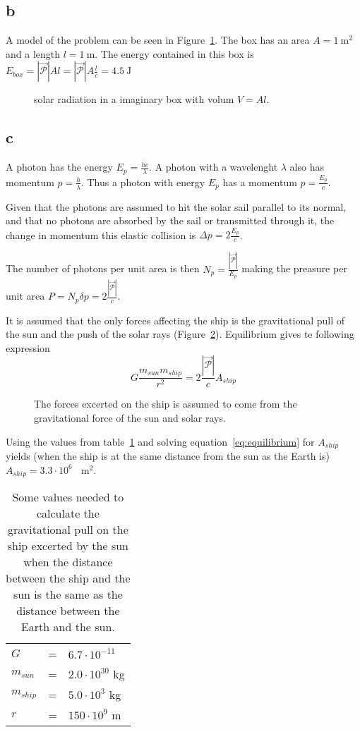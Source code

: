 \documentclass[12pt,a4paper]{article}
\begin{document}
\subsection{b}
A model of the problem can be seen in Figure~\ref{fig:box}. The box has an area $A=\SI{1}{\metre^2}$ and a length $l=\SI{1}{\metre}$.
The energy contained in this box is $E_{box}=|\vec{\mathcal{P}}|Al=|\vec{\mathcal{P}}|A\frac{l}{c}=\SI{4.5}{\joule}$
\begin{figure}\centering
  \scalebox{1}{}
  \caption{\label{fig:box} solar radiation in a imaginary box with volum $V=Al$.}
\end{figure}

\subsection{c}
A photon has the energy $E_p=\frac{hc}{\lambda}$. A photon with a wavelenght $\lambda$ also has momentum $p=\frac{h}{\lambda}$. Thus a photon with energy $E_p$ has a momentum $p=\frac{E_p}{c}$.

Given that the photons are assumed to hit the solar sail parallel to its normal, and that no photons are absorbed by the sail or transmitted through it, the change in momentum this elastic collision is $\Delta p=2\frac{E_p}{c}$.

The number of photons per unit area is then $N_p=\frac{|\vec{\mathcal{P}}|}{E_p}$ making the preasure per unit area $P=N_p\delta p=2\frac{|\vec{\mathcal{P}}|}{c}$.

It is assumed that the only forces affecting the ship is the gravitational pull of the sun and the push of the solar rays (Figure~\ref{fig:ship}). Equilibrium gives te following expression
\begin{equation}
  G\frac{m_{sun}m_{ship}}{r^2}=2\frac{|\vec{\mathcal{P}}|}{c}A_{ship}
  \label{eq:equilibrium}
\end{equation}
\begin{figure}\centering
  \scalebox{1}{}
  \caption{\label{fig:ship} The forces excerted on the ship is assumed to come from the gravitational force of the sun and solar rays.}
\end{figure}
Using the values from table~\ref{tab:constants} and solving equation~\ref{eq:equilibrium} for $A_{ship}$ yields (when the ship is at the same distance from the sun as the Earth is) $A_{ship}=3.3\cdot 10^{6}\text{ }\SI{}{\metre^2}$.
\begin{table}
  \centering
  \caption{\label{tab:constants} Some values needed to calculate the gravitational pull on the ship excerted by the sun when the distance between the ship and the sun is the same as the distance between the Earth and the sun.}
  \begin{tabular}{|lll|} \hline
    $G$ & = & $6.7\cdot 10^{-11}$ \\
    $m_{sun}$ & = & $2.0\cdot 10^{30}$ kg \\
    $m_{ship}$ & = & $5.0\cdot 10^{3}$ kg \\
    $r$ & = & $150\cdot 10^{9}$ m \\ \hline
  \end{tabular}
\end{table}
\end{document}
